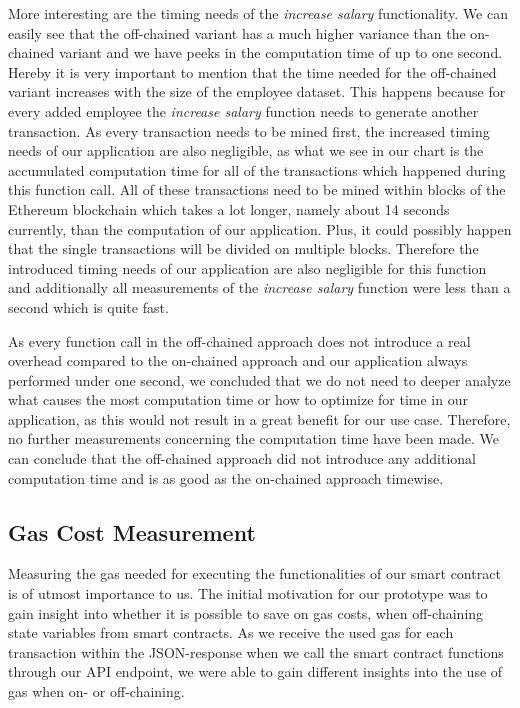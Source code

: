 More interesting are the timing needs of the \textit{increase salary} functionality.
We can easily see that the off-chained variant has a much higher variance than the on-chained variant and we have peeks in the computation time of up to one second.
Hereby it is very important to mention that the time needed for the off-chained variant increases with the size of the employee dataset.
This happens because for every added employee the \textit{increase salary} function needs to generate another transaction.
As every transaction needs to be mined first, the increased timing needs of our application are also negligible, as what we see in our chart is the accumulated computation time for all of the transactions which happened during this function call.
All of these transactions need to be mined within blocks of the Ethereum blockchain which takes a lot longer, namely about 14 seconds currently, than the computation of our application.
Plus, it could possibly happen that the single transactions will be divided on multiple blocks.
Therefore the introduced timing needs of our application are also negligible for this function and additionally all measurements of the \textit{increase salary} function were less than a second which is quite fast.%

As every function call in the off-chained approach does not introduce a real overhead compared to the on-chained approach and our application always performed under one second, we concluded that we do not need to deeper analyze what causes the most computation time or how to optimize for time in our application, as this would not result in a great benefit for our use case.
Therefore, no further measurements concerning the computation time have been made.
We can conclude that the off-chained approach did not introduce any additional computation time and is as good as the on-chained approach timewise.

\subsection{Gas Cost Measurement}
Measuring the gas needed for executing the functionalities of our smart contract is of utmost importance to us.
The initial motivation for our prototype was to gain insight into whether it is possible to save on gas costs, when off-chaining state variables from smart contracts.
As we receive the used gas for each transaction within the JSON-response when we call the smart contract functions through our API endpoint, we were able to gain different insights into the use of gas when on- or off-chaining.

